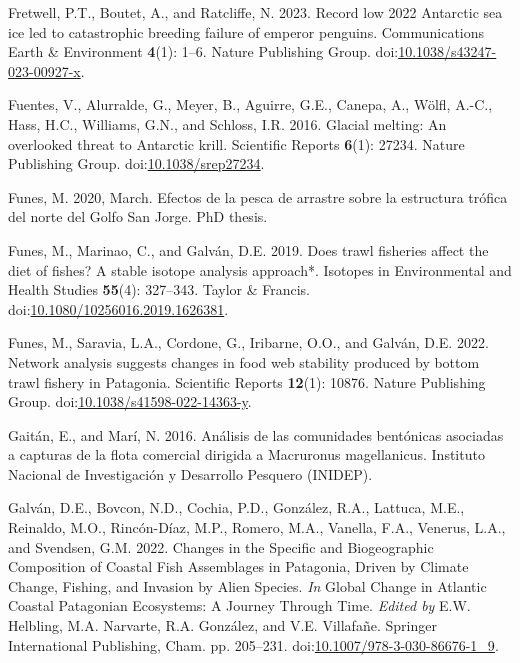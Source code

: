 \documentclass[
]{article}
\newlength{\cslhangindent}
\newenvironment{CSLReferences}[2] %
 {\begin{list}{}{%
  \setlength{\itemindent}{0pt}
  \setlength{\leftmargin}{0pt}
  \setlength{\parsep}{0pt}
  \ifodd #1
   \setlength{\leftmargin}{\cslhangindent}
   \setlength{\itemindent}{-1\cslhangindent}
  \fi
  \setlength{\itemsep}{#2\baselineskip}}}
 {\end{list}}
\begin{document}
\begin{CSLReferences}{1}{0}
Fretwell, P.T., Boutet, A., and Ratcliffe, N. 2023. Record low 2022
{Antarctic} sea ice led to catastrophic breeding failure of emperor
penguins. Communications Earth \& Environment \textbf{4}(1): 1--6.
Nature Publishing Group.
doi:\href{https://doi.org/10.1038/s43247-023-00927-x}{10.1038/s43247-023-00927-x}.

Fuentes, V., Alurralde, G., Meyer, B., Aguirre, G.E., Canepa, A., Wölfl,
A.-C., Hass, H.C., Williams, G.N., and Schloss, I.R. 2016. Glacial
melting: An overlooked threat to {Antarctic} krill. Scientific Reports
\textbf{6}(1): 27234. Nature Publishing Group.
doi:\href{https://doi.org/10.1038/srep27234}{10.1038/srep27234}.

Funes, M. 2020, March. Efectos de la pesca de arrastre sobre la
estructura tr{ó}fica del norte del {Golfo San Jorge}. PhD thesis.

Funes, M., Marinao, C., and Galván, D.E. 2019. Does trawl fisheries
affect the diet of fishes? {A} stable isotope analysis approach*.
Isotopes in Environmental and Health Studies \textbf{55}(4): 327--343.
Taylor \& Francis.
doi:\href{https://doi.org/10.1080/10256016.2019.1626381}{10.1080/10256016.2019.1626381}.

Funes, M., Saravia, L.A., Cordone, G., Iribarne, O.O., and Galván, D.E.
2022. Network analysis suggests changes in food web stability produced
by bottom trawl fishery in {Patagonia}. Scientific Reports
\textbf{12}(1): 10876. Nature Publishing Group.
doi:\href{https://doi.org/10.1038/s41598-022-14363-y}{10.1038/s41598-022-14363-y}.

Gaitán, E., and Marí, N. 2016. {An{á}lisis de las comunidades
bent{ó}nicas asociadas a capturas de la flota comercial dirigida a
Macruronus magellanicus}. Instituto Nacional de Investigaci{ó}n y
Desarrollo Pesquero (INIDEP).

Galván, D.E., Bovcon, N.D., Cochia, P.D., González, R.A., Lattuca, M.E.,
Reinaldo, M.O., Rincón-Díaz, M.P., Romero, M.A., Vanella, F.A., Venerus,
L.A., and Svendsen, G.M. 2022. Changes in the {Specific} and
{Biogeographic Composition} of {Coastal Fish Assemblages} in
{Patagonia}, {Driven} by {Climate Change}, {Fishing}, and {Invasion} by
{Alien Species}. \emph{In} Global {Change} in {Atlantic Coastal
Patagonian Ecosystems}: {A Journey Through Time}. \emph{Edited by} E.W.
Helbling, M.A. Narvarte, R.A. González, and V.E. Villafañe. Springer
International Publishing, Cham. pp. 205--231.
doi:\href{https://doi.org/10.1007/978-3-030-86676-1_9}{10.1007/978-3-030-86676-1\_9}.


\end{CSLReferences}
\end{document}
